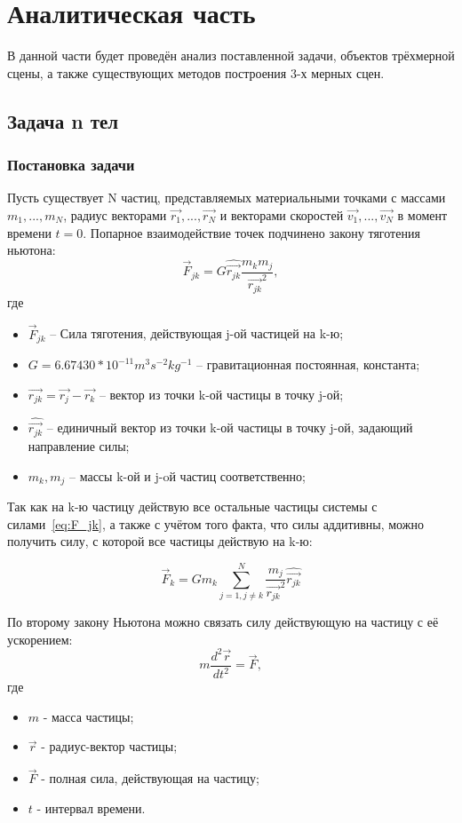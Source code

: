 \chapter{Аналитическая часть}

В данной части будет проведён анализ поставленной задачи, объектов трёхмерной сцены, а также существующих методов построения 3-х мерных сцен.

\section{Задача n тел}
\subsection*{Постановка задачи}
Пусть существует N частиц, представляемых материальными точками с массами $m_1, ..., m_N$, радиус векторами $\vec{r_1}, ..., \vec{r_N}$ и векторами скоростей $\vec{v_1}, ..., \vec{v_N}$ в момент времени $t=0$.
Попарное взаимодействие точек подчинено закону тяготения ньютона:
\begin{equation}
	\label{eq:F_jk}
	\vec{F}_{jk} = G\hat{\vec{r_{jk}}}\frac{m_km_j}{\vec{r_{jk}}^2},
\end{equation}
где
\begin{itemize}
	\item $\vec{F}_{jk}$ -- Сила тяготения, действующая j-ой частицей на k-ю;
	\item $G = 6.67430 * 10^{-11} m^3s^{-2}kg^{-1}$ -- гравитационная постоянная, константа;
	\item $\vec{r_{jk}} = \vec{r_j} - \vec{r_k}$ -- вектор из точки k-ой частицы в точку j-ой;
	\item $\hat{\vec{r_{jk}}}$ -- единичный вектор из точки k-ой частицы в точку j-ой, задающий направление силы;
	\item $m_k, m_j$ -- массы k-ой и j-oй частиц соответственно;
\end{itemize}

Так как на k-ю частицу действую все остальные частицы системы с силами~\ref{eq:F_jk}, а также с учётом того факта, что силы аддитивны, можно получить силу, с которой все частицы действую на k-ю:

\begin{equation}
	\label{eq:F_sumk}
	\vec{F}_{k} = Gm_k\sum_{j=1, j \neq k}^{N}{\frac{m_j}{\vec{r_{jk}}^2}\hat{\vec{r_{jk}}}}
\end{equation}

По второму закону Ньютона можно связать силу действующую на частицу с её ускорением:
\begin{equation}
	\label{eq:newton2}
	m\frac{d^2\vec{r}}{dt^2} = \vec{F},
\end{equation}
где
\begin{itemize}
	\item $m$ - масса частицы;
	\item $\vec{r}$ - радиус-вектор частицы;
	\item $\vec{F}$ - полная сила, действующая на частицу;
	\item $t$ - интервал времени.
\end{itemize}


